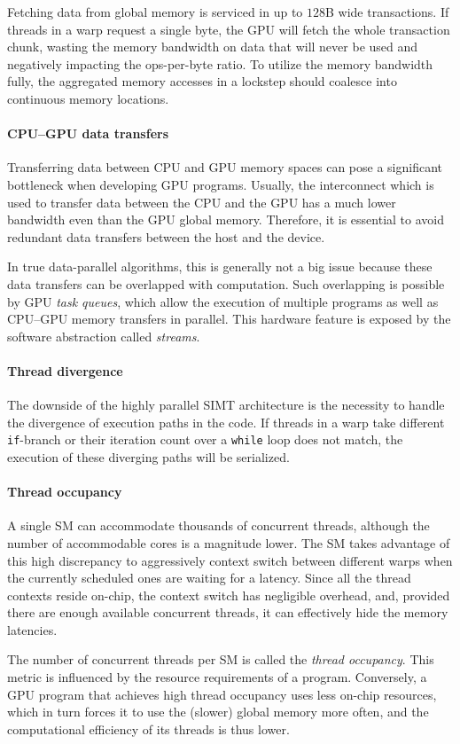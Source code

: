 Fetching data from global memory is serviced in up to $128$B wide transactions. If threads in a warp request a single byte, the GPU will fetch the whole transaction chunk, wasting the memory bandwidth on data that will never be used and negatively impacting the ops-per-byte ratio. To utilize the memory bandwidth fully, the aggregated memory accesses in a lockstep should coalesce into continuous memory locations.

\paragraph{CPU--GPU data transfers}
\label{sec:transfers}

Transferring data between CPU and GPU memory spaces can pose a significant bottleneck when developing GPU programs. Usually, the interconnect which is used to transfer data between the CPU and the GPU has a much lower bandwidth even than the GPU global memory. Therefore, it is essential to avoid redundant data transfers between the host and the device.

In true data-parallel algorithms, this is generally not a big issue because these data transfers can be overlapped with computation. Such overlapping is possible by GPU \emph{task queues}, which allow the execution of multiple programs as well as CPU--GPU memory transfers in parallel. This hardware feature is exposed by the software abstraction called \emph{streams}.

\paragraph{Thread divergence}
\label{sec:divergence}

The downside of the highly parallel SIMT architecture is the necessity to handle the divergence of execution paths in the code.
If threads in a warp take different \texttt{if}-branch or their iteration count over a \texttt{while} loop does not match, the execution of these diverging paths will be serialized.

\paragraph{Thread occupancy}
\label{sec:occupancy}

A single SM can accommodate thousands of concurrent threads, although the number of accommodable cores is a magnitude lower. The SM takes advantage of this high discrepancy to aggressively context switch between different warps when the currently scheduled ones are waiting for a latency. Since all the thread contexts reside on-chip, the context switch has negligible overhead, and, provided there are enough available concurrent threads, it can effectively hide the memory latencies.

The number of concurrent threads per SM is called the \emph{thread occupancy}. This metric is influenced by the resource requirements of a program. Conversely, a GPU program that achieves high thread occupancy uses less on-chip resources, which in turn forces it to use the (slower) global memory more often, and the computational efficiency of its threads is thus lower.
